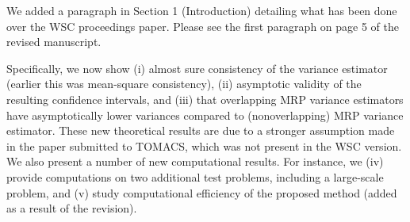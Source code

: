 \documentclass[11pt,notitlepage,onecolumn]{article}
\newcommand{\noi}{\noindent}
\begin{document}
\noindent
We added a paragraph in Section 1 (Introduction) detailing what has been done over the WSC proceedings paper. 
Please see the first paragraph on page 5 of the revised manuscript.\bigskip  

\noi 
Specifically, we now show (i) almost sure consistency of the variance estimator (earlier this was mean-square consistency), (ii) asymptotic validity of the resulting confidence intervals, and (iii) that overlapping MRP variance estimators have asymptotically lower variances compared to (nonoverlapping) MRP variance estimator. 
These new theoretical results are due to a stronger assumption made in the paper submitted to TOMACS, which was not present in the WSC version. 
We also present a number of new computational results. 
For instance, we (iv) provide computations on two additional test problems, including a large-scale problem, and (v) study computational efficiency of the proposed method (added as a result of the revision). 
\end{document}
